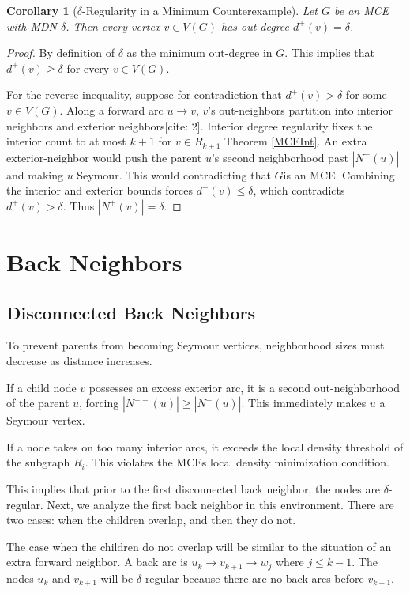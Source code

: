 \documentclass[AMS, Times1COL]{article} %
\newtheorem{corollary}[theorem]{Corollary}
\theoremstyle{definition}
\begin{document}
	\begin{corollary}[$\delta$-Regularity in a Minimum Counterexample]
		\label{delta_regular}
		Let $G$ be an MCE with MDN $\delta$. Then every vertex $v \in V(G)$ has out-degree $d^+(v) = \delta$.
	\end{corollary}
	
	\begin{proof}
		By definition of $\delta$ as the minimum out-degree in $G$. This implies that $d^+(v) \ge \delta$ for every $v \in V(G)$.
		
		For the reverse inequality, suppose for contradiction that $d^+(v) > \delta$ for some $v \in V(G)$. Along a forward arc $u \to v$, $v$'s out-neighbors partition into interior neighbors and exterior neighbors[cite: 2]. Interior degree regularity fixes the interior count to at most $k+1$ for $v \in R_{k+1}$ Theorem \ref{MCEInt}. An extra exterior-neighbor would push the parent $u$'s second neighborhood past $|N^+(u)|$ and making $u$ Seymour. This would contradicting that $G$is an MCE. Combining the interior and exterior bounds forces $d^+(v) \le \delta$, which contradicts $d^+(v) > \delta$. Thus $|N^+(v)| = \delta$.
	\end{proof}
	\section{Back Neighbors}
	\subsection{Disconnected Back Neighbors}
	
	To prevent parents from becoming Seymour vertices, neighborhood sizes must decrease as distance increases.
	
	If a child node $v$ possesses an excess exterior arc, it is a second out-neighborhood of the parent $u$, 
	forcing $|N^{++}(u)| \ge |N^{+}(u)|$. This immediately makes $u$ a Seymour vertex.
	
	If a node takes on too many interior arcs, it exceeds the local density threshold of the subgraph $R_i$. This violates the MCEs local density minimization condition.
	
	This implies that prior to the first disconnected back neighbor, the nodes are $\delta$-regular. Next, we analyze the first back neighbor in this environment. There are two cases: when the children overlap, and then they do not. 
	
	The case when the children do not overlap will be similar to the situation of an extra forward neighbor. A back arc is $u_k \to v_{k+1} \to w_j$ where $j \le k-1$. The nodes $u_k$ and $v_{k+1}$ will be $\delta$-regular because there are no back arcs before $v_{k+1}$. 
	
\end{document}

